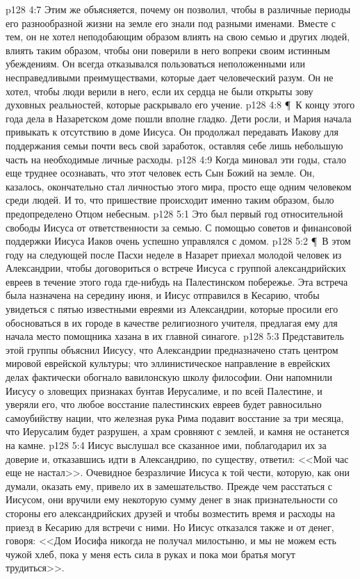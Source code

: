 \vs p128 4:7 Этим же объясняется, почему он позволил, чтобы в различные периоды его разнообразной жизни на земле его знали под разными именами. Вместе с тем, он не хотел неподобающим образом влиять на свою семью и других людей, влиять таким образом, чтобы они поверили в него вопреки своим истинным убеждениям. Он всегда отказывался пользоваться неположенными или несправедливыми преимуществами, которые дает человеческий разум. Он не хотел, чтобы люди верили в него, если их сердца не были открыты зову духовных реальностей, которые раскрывало его учение.
\vs p128 4:8 \P\ К концу этого года дела в Назаретском доме пошли вполне гладко. Дети росли, и Мария начала привыкать к отсутствию в доме Иисуса. Он продолжал передавать Иакову для поддержания семьи почти весь свой заработок, оставляя себе лишь небольшую часть на необходимые личные расходы.
\vs p128 4:9 Когда миновал эти годы, стало еще труднее осознавать, что этот человек есть Сын Божий на земле. Он, казалось, окончательно стал личностью этого мира, просто еще одним человеком среди людей. И то, что пришествие происходит именно таким образом, было предопределено Отцом небесным.
\vs p128 5:1 Это был первый год относительной свободы Иисуса от ответственности за семью. С помощью советов и финансовой поддержки Иисуса Иаков очень успешно управлялся с домом.
\vs p128 5:2 \P\ В этом году на следующей после Пасхи неделе в Назарет приехал молодой человек из Александрии, чтобы договориться о встрече Иисуса с группой александрийских евреев в течение этого года где\hyp{}нибудь на Палестинском побережье. Эта встреча была назначена на середину июня, и Иисус отправился в Кесарию, чтобы увидеться с пятью известными евреями из Александрии, которые просили его обосноваться в их городе в качестве религиозного учителя, предлагая ему для начала место помощника хазана в их главной синагоге.
\vs p128 5:3 Представитель этой группы объяснил Иисусу, что Александрии предназначено стать центром мировой еврейской культуры; что эллинистическое направление в еврейских делах фактически обогнало вавилонскую школу философии. Они напомнили Иисусу о зловещих признаках бунтав Иерусалиме, и по всей Палестине, и уверяли его, что любое восстание палестинских евреев будет равносильно самоубийству нации, что железная рука Рима подавит восстание за три месяца, что Иерусалим будет разрушен, а храм сровняют с землей, и камня не останется на камне.
\vs p128 5:4 Иисус выслушал все сказанное ими, поблагодарил их за доверие и, отказавшись идти в Александрию, по существу, ответил: <<Мой час еще не настал>>. Очевидное безразличие Иисуса к той чести, которую, как они думали, оказать ему, привело их в замешательство. Прежде чем расстаться с Иисусом, они вручили ему некоторую сумму денег в знак признательности со стороны его александрийских друзей и чтобы возместить время и расходы на приезд в Кесарию для встречи с ними. Но Иисус отказался также и от денег, говоря: <<Дом Иосифа никогда не получал милостыню, и мы не можем есть чужой хлеб, пока у меня есть сила в руках и пока мои братья могут трудиться>>.
